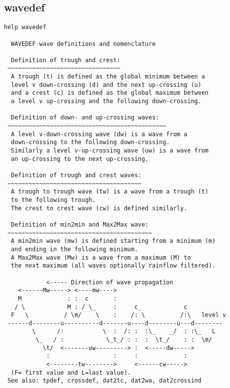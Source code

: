 \subsection{wavedef}
{\small\begin{verbatim}
help wavedef

  WAVEDEF wave definitions and nomenclature

  Definition of trough and crest:
 ~~~~~~~~~~~~~~~~~~~~~~~~~~~~~~~~
  A trough (t) is defined as the global minimum between a
  level v down-crossing (d) and the next up-crossing (u)
  and a crest (c) is defined as the global maximum between
  a level v up-crossing and the following down-crossing.

  Definition of down- and up-crossing waves:
 ~~~~~~~~~~~~~~~~~~~~~~~~~~~~~~~~~~~~~~~~~~~~~
  A level v-down-crossing wave (dw) is a wave from a
  down-crossing to the following down-crossing.
  Similarly a level v-up-crossing wave (uw) is a wave from
  an up-crossing to the next up-crossing.

  Definition of trough and crest waves:
 ~~~~~~~~~~~~~~~~~~~~~~~~~~~~~~~~~~~~~~
  A trough to trough wave (tw) is a wave from a trough (t)
  to the following trough.
  The crest to crest wave (cw) is defined similarly.

  Definition of min2min and Max2Max wave:
 ~~~~~~~~~~~~~~~~~~~~~~~~~~~~~~~~~~~~~~~~~
  A min2min wave (mw) is defined starting from a minimum (m)
  and ending in the following minimum.
  A Max2Max wave (Mw) is a wave from a maximum (M) to
  the next maximum (all waves optionally rainflow filtered).

            <----- Direction of wave propagation
    <------Mw-----> <----mw---->
    M             : :  c       :
   / \            M : / \_     :     c_            c
  F   \          / \m/    \    :    /: \          /:\   level v
 ------d--------u----------d-------u----d--------u---d--------
        \      /:           \  :  /: :  :\_    _/  : :\_   L
         \_   / :            \_t_/ : :  :  \t_/    : :  \m/
           \t/  <-------uw---------> :  <-----dw----->
            :                  :     :             :
            <--------tw-------->     <------cw----->
  (F= first value and L=last value).
 See also: tpdef, crossdef, dat2tc, dat2wa, dat2crossind
\end{verbatim}
}

\newpage
